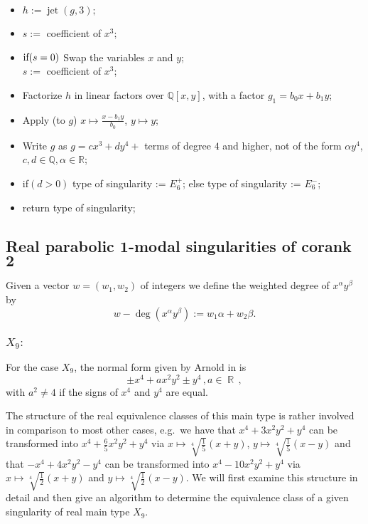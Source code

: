 \documentclass[noend]{amsproc}
\DeclareMathOperator{\jt}{jet}
\DeclareMathOperator{\R}{\mathbb{R}}
\begin{document}
\begin{itemize}
\item $h:= \jt(g,3);$
\item $s:=$ coefficient of ${x^3};$
\item $\textnormal{if}(s=0)$\newline
\phantom{}\quad Swap the variables $x$ and $y$;\\
\phantom{}\quad $s:=$ coefficient of ${x^3}$;
\item Factorize $h$ in linear factors over $\mathbb Q[x,y]$, with a factor
$g_1=b_0x+b_1y$;
\item Apply (to $g$) $x\mapsto \frac{x-b_1y}{b_0}$, $y\mapsto y$;
\item Write $g$ as $g=cx^3+d y^4+$ terms of degree $4$
and higher, not of the form $\alpha y^4$,
$c,d\in\mathbb Q, \alpha\in\mathbb R$;
\item \textnormal{if}$(d>0)$\newline
\phantom{}\quad type of singularity := $E_6^+$;\newline
\phantom{} else\newline
\phantom{}\quad type of singularity := $E_6^-$;
\item return type of singularity;
\end{itemize}

\subsection{Real parabolic $\mathbf 1$-modal singularities of corank $\mathbf 2$}
Given a vector $w=(w_1,w_2)$ of integers we define the weighted degree of
$x^\alpha y^\beta$ by \[w-\deg(x^\alpha y^\beta):=w_1\alpha+w_2\beta.\]

\subsubsection{$X_9:$}\label{X_9}
For the case $X_9$, the normal form given by Arnold in \cite{AVG1985} is
\[
\pm x^4 +a x^2 y^2 \pm y^4 \,, a \in \R \,,
\]
with $a^2 \neq 4$ if the signs of $x^4$ and $y^4$ are equal.

The structure of the real equivalence classes of this main type is rather
involved in comparison to most other cases, e.g.~we have that
$x^4 +3 x^2 y^2 +y^4$ can be transformed into $x^4+\frac{6}{5} x^2 y^2 +y^4$
via $x \mapsto \sqrt[4]{\frac{1}{5}}(x+y)$,
$y \mapsto \sqrt[4]{\frac{1}{5}}(x-y)$ and that $-x^4 +4x^2 y^2 -y^4$ can be
transformed into $x^4 -10 x^2 y^2 +y^4$ via
$x \mapsto \sqrt[4]{\frac{1}{2}}(x+y)$ and
$y \mapsto \sqrt[4]{\frac{1}{2}}(x-y)$. We will first examine this structure in
detail and then give an algorithm to determine the equivalence class of a given
singularity of real main type $X_9$.
\end{document}

